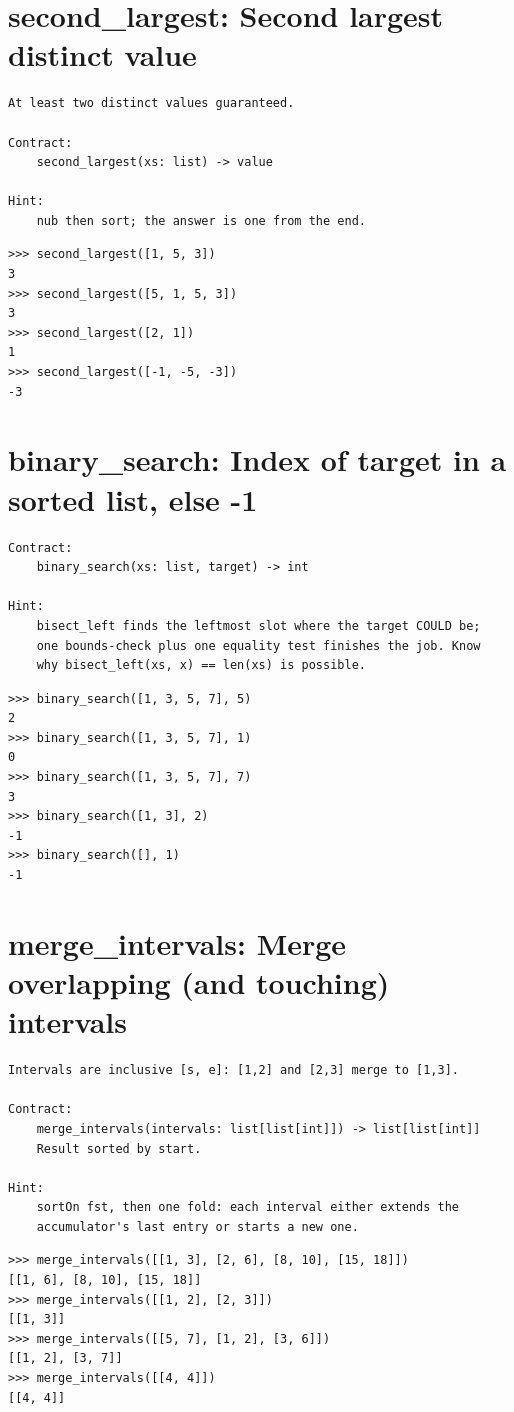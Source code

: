 \documentclass[10pt,letterpaper]{book}
\begin{document}
\section{second\_largest: Second largest distinct value}
\begin{lstlisting}[style=ex]
At least two distinct values guaranteed.

Contract:
    second_largest(xs: list) -> value

Hint:
    nub then sort; the answer is one from the end.
\end{lstlisting}
\begin{lstlisting}[style=ex]
>>> second_largest([1, 5, 3])
3
>>> second_largest([5, 1, 5, 3])
3
>>> second_largest([2, 1])
1
>>> second_largest([-1, -5, -3])
-3
\end{lstlisting}

\section{binary\_search: Index of target in a sorted list, else -1}
\begin{lstlisting}[style=ex]
Contract:
    binary_search(xs: list, target) -> int

Hint:
    bisect_left finds the leftmost slot where the target COULD be;
    one bounds-check plus one equality test finishes the job. Know
    why bisect_left(xs, x) == len(xs) is possible.
\end{lstlisting}
\begin{lstlisting}[style=ex]
>>> binary_search([1, 3, 5, 7], 5)
2
>>> binary_search([1, 3, 5, 7], 1)
0
>>> binary_search([1, 3, 5, 7], 7)
3
>>> binary_search([1, 3], 2)
-1
>>> binary_search([], 1)
-1
\end{lstlisting}

\section{merge\_intervals: Merge overlapping (and touching) intervals}
\begin{lstlisting}[style=ex]
Intervals are inclusive [s, e]: [1,2] and [2,3] merge to [1,3].

Contract:
    merge_intervals(intervals: list[list[int]]) -> list[list[int]]
    Result sorted by start.

Hint:
    sortOn fst, then one fold: each interval either extends the
    accumulator's last entry or starts a new one.
\end{lstlisting}
\begin{lstlisting}[style=ex]
>>> merge_intervals([[1, 3], [2, 6], [8, 10], [15, 18]])
[[1, 6], [8, 10], [15, 18]]
>>> merge_intervals([[1, 2], [2, 3]])
[[1, 3]]
>>> merge_intervals([[5, 7], [1, 2], [3, 6]])
[[1, 2], [3, 7]]
>>> merge_intervals([[4, 4]])
[[4, 4]]
\end{lstlisting}
\end{document}
